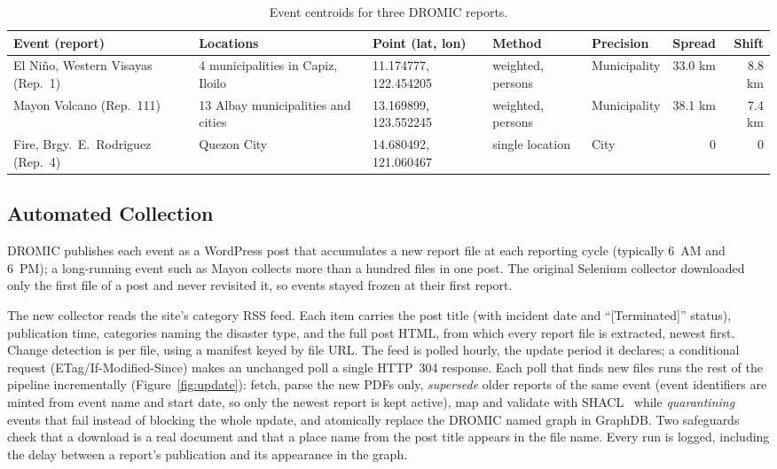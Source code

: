 \documentclass[acmtog]{acmart}
\begin{document}
\begin{table}[t]
  \caption{Event centroids for three DROMIC reports.}
  \label{tab:events}
  \footnotesize
  \setlength{\tabcolsep}{3pt}
  \begin{tabular}{p{3.4cm}p{3.0cm}lllrr}
    \toprule
    Event (report) & Locations & Point (lat, lon) & Method & Precision & Spread & Shift \\
    \midrule
    El Ni\~no, Western Visayas (Rep.~1) & 4 municipalities in Capiz, Iloilo & 11.174777, 122.454205 & weighted, persons & Municipality & 33.0 km & 8.8 km \\
    Mayon Volcano (Rep.~111) & 13 Albay municipalities and cities & 13.169899, 123.552245 & weighted, persons & Municipality & 38.1 km & 7.4 km \\
    Fire, Brgy.\ E.~Rodriguez (Rep.~4) & Quezon City & 14.680492, 121.060467 & single location & City & 0 & 0 \\
    \bottomrule
  \end{tabular}
\end{table}

\subsection{Automated Collection}

DROMIC publishes each event as a WordPress post that accumulates a new report file at each
reporting cycle (typically 6~AM and 6~PM); a long-running event such as Mayon collects more than a
hundred files in one post. The original Selenium collector downloaded only the first file of a
post and never revisited it, so events stayed frozen at their first report.

The new collector reads the site's category RSS feed. Each item carries the post title (with
incident date and ``[Terminated]'' status), publication time, categories naming the disaster type,
and the full post HTML, from which every report file is extracted, newest first. Change detection
is per file, using a manifest keyed by file URL. The feed is polled hourly, the update period it
declares; a conditional request (ETag/If-Modified-Since) makes an unchanged poll a single
HTTP~304 response. Each poll that finds new files runs the rest of the pipeline incrementally
(Figure~\ref{fig:update}): fetch, parse the new PDFs only, \emph{supersede} older reports of the
same event (event identifiers are minted from event name and start date, so only the newest report
is kept active), map and validate with SHACL~\cite{w3c2017shacl} while \emph{quarantining} events
that fail instead of blocking the whole update, and atomically replace the DROMIC named graph in
GraphDB. Two safeguards check that a download is a real document and that a place name from the
post title appears in the file name. Every run is logged, including the delay between a report's
publication and its appearance in the graph.
\end{document}
